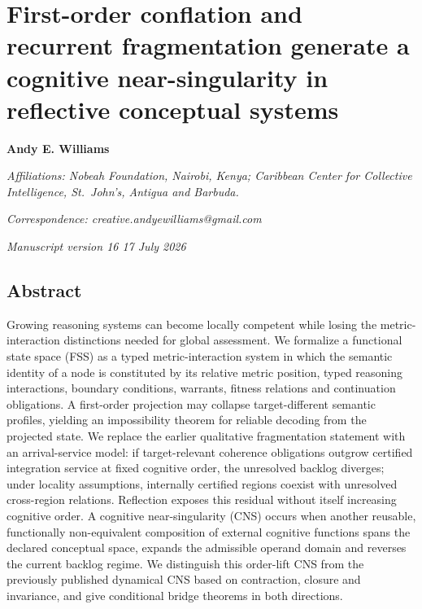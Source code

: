 \hypertarget{first-order-conflation-and-recurrent-fragmentation-generate-a-cognitive-near-singularity-in-reflective-conceptual-systems}{%
\section{First-order conflation and recurrent fragmentation generate a
cognitive near-singularity in reflective conceptual
systems}\label{first-order-conflation-and-recurrent-fragmentation-generate-a-cognitive-near-singularity-in-reflective-conceptual-systems}}

\textbf{Andy E. Williams}

\emph{Affiliations: Nobeah Foundation, Nairobi, Kenya; Caribbean Center
for Collective Intelligence, St.~John's, Antigua and Barbuda.}

\emph{Correspondence: creative.andyewilliams@gmail.com}

\emph{Manuscript version 16 \textbar{} 17 July 2026}

\hypertarget{abstract}{%
\subsection{Abstract}\label{abstract}}

Growing reasoning systems can become locally competent while losing the
metric-interaction distinctions needed for global assessment. We
formalize a functional state space (FSS) as a typed metric-interaction
system in which the semantic identity of a node is constituted by its
relative metric position, typed reasoning interactions, boundary
conditions, warrants, fitness relations and continuation obligations. A
first-order projection may collapse target-different semantic profiles,
yielding an impossibility theorem for reliable decoding from the
projected state. We replace the earlier qualitative fragmentation
statement with an arrival-service model: if target-relevant coherence
obligations outgrow certified integration service at fixed cognitive
order, the unresolved backlog diverges; under locality assumptions,
internally certified regions coexist with unresolved cross-region
relations. Reflection exposes this residual without itself increasing
cognitive order. A cognitive near-singularity (CNS) occurs when another
reusable, functionally non-equivalent composition of external cognitive
functions spans the declared conceptual space, expands the admissible
operand domain and reverses the current backlog regime. We distinguish
this order-lift CNS from the previously published dynamical CNS based on
contraction, closure and invariance, and give conditional bridge
theorems in both directions.

